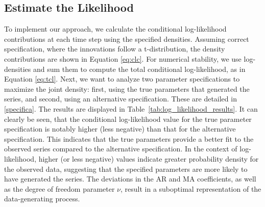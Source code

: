 \documentclass[11pt]{article}
\begin{document}
 \subsection{Estimate the Likelihood}
To implement our approach, we calculate the conditional log-likelihood contributions at each time step using the specified densities.
 Assuming correct specification, where the innovations follow a t-distribution, the density contributions are shown in Equation \eqref{eq:clc}. For numerical stability, we use log-densities and sum them to compute the total conditional log-likelihood, as in Equation \eqref{eq:tcl}.
Next, we want to analyze two parameter specifications to maximize the joint density: first, using the true parameters that generated the series, and second, using an alternative specification. These are detailed in \ref{specifica}.
The results are displayed in Table~\ref{tab:log_likelihood_results}.
It can clearly be seen, that the conditional log-likelihood value for the true parameter specification is notably higher (less negative) than that for the alternative specification. This indicates that the true parameters provide a better fit to the observed series compared to the alternative specification.
In the context of log-likelihood, higher (or less negative) values indicate greater probability density for the observed data, suggesting that the specified parameters are more likely to have generated the series.
The deviations in the AR and MA coefficients, as well as the degree of freedom parameter $\nu$, result in a suboptimal representation of the data-generating process. 
\end{document}
